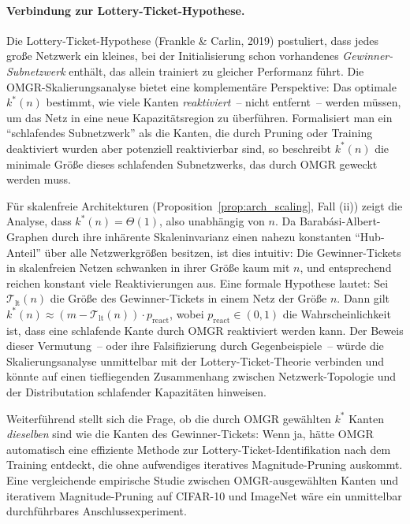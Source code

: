 \documentclass[12pt, a4paper, openany]{report}
\begin{document}
\paragraph{Verbindung zur Lottery-Ticket-Hypothese.}
Die Lottery-Ticket-Hypothese (Frankle \& Carlin, 2019) postuliert, dass jedes
große Netzwerk ein kleines, bei der Initialisierung schon vorhandenes
\emph{Gewinner-Subnetzwerk} enthält, das allein trainiert zu gleicher Performanz
führt.  Die OMGR-Skalierungsanalyse bietet eine komplementäre Perspektive:
Das optimale $k^*(n)$ bestimmt, wie viele Kanten \emph{reaktiviert}~-- nicht
entfernt~-- werden müssen, um das Netz in eine neue Kapazitätsregion zu
überführen.  Formal\-isiert man ein ``schlafendes Subnetzwerk'' als die Kanten,
die durch Pruning oder Training deaktiviert wurden aber potenziell reaktivierbar
sind, so beschreibt $k^*(n)$ die minimale Größe dieses schlafenden
Subnetzwerks, das durch OMGR geweckt werden muss.

Für skalenfreie Architekturen (Proposition~\ref{prop:arch_scaling}, Fall (ii))
zeigt die Analyse, dass $k^*(n) = \Theta(1)$, also unabhängig von $n$.  Da
Barabási-Albert-Graphen durch ihre inhärente Skaleninvarianz einen
nahezu konstanten ``Hub-Anteil'' über alle Netzwerkgrößen besitzen, ist dies
intuitiv: Die Gewinner-Tickets in skalenfreien Netzen schwanken in ihrer
Größe kaum mit $n$, und entsprechend reichen konstant viele Reaktivierungen
aus.  Eine formale Hypothese lautet: Sei $\mathcal{T}_{\mathrm{lt}}(n)$
die Größe des Gewinner-Tickets in einem Netz der Größe $n$.  Dann gilt
$k^*(n) \approx (m - \mathcal{T}_{\mathrm{lt}}(n)) \cdot p_{\mathrm{react}}$,
wobei $p_{\mathrm{react}} \in (0,1)$ die Wahrscheinlichkeit ist, dass eine
schlafende Kante durch OMGR reaktiviert werden kann.  Der Beweis dieser
Vermutung~-- oder ihre Falsifizierung durch Gegenbeispiele~-- würde die
Skalierungsanalyse unmittelbar mit der Lottery-Ticket-Theorie verbinden und
könnte auf einen tiefliegenden Zusammenhang zwischen Netzwerk-Topologie und
der Distributation schlafender Kapazitäten hinweisen.

Weiterführend stellt sich die Frage, ob die durch OMGR gewählten $k^*$ Kanten
\emph{dieselben} sind wie die Kanten des Gewinner-Tickets: Wenn ja, hätte OMGR
automatisch eine effiziente Methode zur Lottery-Ticket-Identifikation nach dem
Training entdeckt, die ohne aufwendiges iteratives Magnitude-Pruning auskommt.
Eine vergleichende empirische Studie zwischen OMGR-ausgewählten Kanten und
iterativem Magnitude-Pruning auf CIFAR-10 und ImageNet wäre ein unmittelbar
durchführbares Anschlussexperiment.
\end{document}
